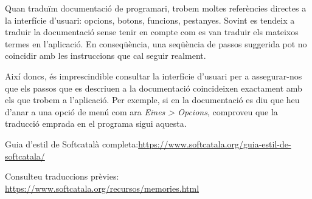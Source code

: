 \documentclass[9pt]{cheatsheet}
\begin{document}
\begin{multicols*}{3}

Quan traduïm documentació de programari, trobem moltes referències directes a la interfície d'usuari: opcions, botons, funcions, pestanyes. Sovint es tendeix a traduir la documentació sense tenir en compte com es van traduir els mateixos termes en l'aplicació. En conseqüència, una seqüència de passos suggerida pot no coincidir amb les instruccions que cal seguir realment. 

Així doncs, és imprescindible consultar la interfície d'usuari per a assegurar-nos que els passos que es descriuen a la documentació coincideixen exactament amb els que trobem a l'aplicació. Per exemple, si en la documentació es diu que heu d'anar a una opció de menú com ara \emph{Eines > Opcions}, comproveu que la traducció emprada en el programa sigui aquesta.


Guia d'estil de Softcatalà completa:\url{https://www.softcatala.org/guia-estil-de-softcatala/}

Consulteu traduccions prèvies: \url{https://www.softcatala.org/recursos/memories.html}

\end{multicols*}
\end{document}
